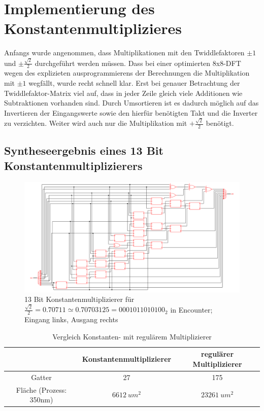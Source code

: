 \section{Implementierung des Konstantenmultiplizieres}\label{sec:Konstantenmultiplizierer}

Anfangs wurde angenommen, dass Multiplikationen mit den Twiddlefaktoren $\pm 1$ und $\pm\frac{\sqrt{2}}{2}$ durchgeführt werden müssen. 
Dass bei einer optimierten 8x8-DFT wegen des explizieten ausprogrammierens der Berechnungen die Multiplikation mit $\pm1$ wegfällt, wurde recht schnell klar.
Erst bei genauer Betrachtung der Twiddlefaktor-Matrix viel auf, dass in jeder Zeile gleich viele Additionen wie Subtraktionen vorhanden sind. Durch Umsortieren 
ist es dadurch möglich auf das Invertieren der Eingangswerte sowie den hierfür benötigten Takt und die Inverter zu verzichten. Weiter wird auch nur die Multiplikation
mit $+\frac{\sqrt{2}}{2}$ benötigt.

\subsection{Syntheseergebnis eines 13 Bit Konstantenmultiplizierers}\label{sec:SyntheseergebnisKonstantenmultiplizierer}
\begin{figure}[!ht]
\centering  
  \includegraphics[width=1\textwidth]{img/13Bit_Konstantenmultiplizierer_Netlist.png}
  \caption{13 Bit Konstantenmultiplizierer für $\frac{\sqrt{2}}{2} = 0.70711 \simeq 0.70703125 = 0001011010100_2$ in Encounter; Eingang links, Ausgang rechts}
  \label{pic:Konstantenmultiplizierer}
\end{figure}



\begin{table}[!ht]
 \caption{Vergleich Konstanten- mit regulärem Multiplizierer}
 \label{tab:VergleichMultiplizierer}
 \begin{tabular}{ccc}
 \hline
				& Konstantenmultiplizierer 	& regulärer Multiplizierer\\
  \hline	
  Gatter			& 27				& 175 \\
  Fläche (Prozess: 350nm)	& $\SI{6612}{um^2}$		& $\SI{23261}{um^2}$\\
  \hline
 \end{tabular}
\end{table}






